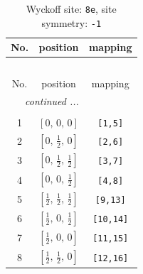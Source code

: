\documentclass[fleqn,8pt]{jsarticle}
\begin{document}
\renewcommand{\arraystretch}{1.2}
\begin{longtable}{ccc}
\caption{Wyckoff site: {\tt 8e}, site symmetry: {\tt -1}}
 \\
 \hline \hline
No. & position & mapping \\ \hline \endfirsthead

\multicolumn{2}{l}{\tablename\ \thetable{}} \\
 \hline \hline
No. & position & mapping \\ \hline \endhead

 \hline \hline
\multicolumn{2}{r}{\footnotesize\it continued ...} \\ \endfoot

 \hline \hline
\multicolumn{2}{r}{} \\ \endlastfoot

1 & $\left[ 0,\, 0,\, 0 \right]$ & {\tt [1,5]} \\ \hline
2 & $\left[ 0,\, \frac{1}{2},\, 0 \right]$ & {\tt [2,6]} \\ \hline
3 & $\left[ 0,\, \frac{1}{2},\, \frac{1}{2} \right]$ & {\tt [3,7]} \\ \hline
4 & $\left[ 0,\, 0,\, \frac{1}{2} \right]$ & {\tt [4,8]} \\ \hline
5 & $\left[ \frac{1}{2},\, \frac{1}{2},\, \frac{1}{2} \right]$ & {\tt [9,13]} \\ \hline
6 & $\left[ \frac{1}{2},\, 0,\, \frac{1}{2} \right]$ & {\tt [10,14]} \\ \hline
7 & $\left[ \frac{1}{2},\, 0,\, 0 \right]$ & {\tt [11,15]} \\ \hline
8 & $\left[ \frac{1}{2},\, \frac{1}{2},\, 0 \right]$ & {\tt [12,16]} \\
\end{longtable}
\renewcommand{\arraystretch}{1.2}
\end{document}
